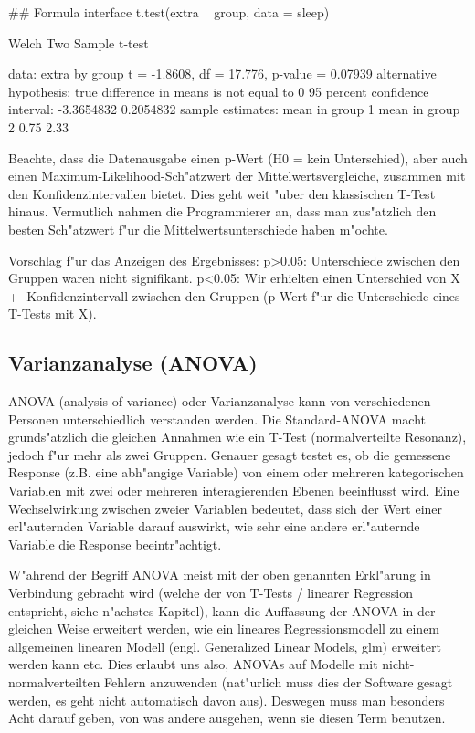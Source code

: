 \documentclass[a4paper,twoside]{tufte-book}\usepackage[]{graphicx}\usepackage[]{color}
\begin{document}
\begin{Schunk}
\begin{Sinput}
## Formula interface
t.test(extra ~ group, data = sleep)
\end{Sinput}
\begin{Soutput}

	Welch Two Sample t-test

data:  extra by group
t = -1.8608, df = 17.776, p-value = 0.07939
alternative hypothesis: true difference in means is not equal to 0
95 percent confidence interval:
 -3.3654832  0.2054832
sample estimates:
mean in group 1 mean in group 2 
           0.75            2.33 
\end{Soutput}
\end{Schunk}

Beachte, dass die Datenausgabe einen p-Wert (H0 = kein Unterschied), aber auch einen Maximum-Likelihood-Sch"atzwert der Mittelwertsvergleiche, zusammen mit den Konfidenzintervallen bietet. Dies geht weit "uber den klassischen T-Test hinaus. Vermutlich nahmen die Programmierer an, dass man zus"atzlich den besten Sch"atzwert f"ur die Mittelwertsunterschiede haben m"ochte.

Vorschlag f"ur das Anzeigen des Ergebnisses: p>0.05: Unterschiede zwischen den Gruppen waren nicht signifikant. p<0.05: Wir erhielten einen Unterschied von X +- Konfidenzintervall zwischen den Gruppen (p-Wert f"ur die Unterschiede eines T-Tests mit X). 

\subsection{Varianzanalyse (ANOVA)}

ANOVA (analysis of variance) oder Varianzanalyse kann von verschiedenen Personen unterschiedlich verstanden werden. Die Standard-ANOVA macht grunds"atzlich die gleichen Annahmen wie ein T-Test (normalverteilte Resonanz), jedoch f"ur mehr als zwei Gruppen. Genauer gesagt testet es, ob die gemessene Response (z.B. eine abh"angige Variable) von einem oder mehreren kategorischen Variablen mit zwei oder mehreren interagierenden Ebenen beeinflusst wird. Eine Wechselwirkung zwischen zweier Variablen bedeutet, dass sich der Wert einer erl"auternden Variable darauf auswirkt, wie sehr eine andere erl"auternde Variable die Response beeintr"achtigt.

W"ahrend der Begriff ANOVA meist mit der oben genannten Erkl"arung in Verbindung gebracht wird (welche der von T-Tests / linearer Regression entspricht, siehe n"achstes Kapitel), kann die Auffassung der ANOVA in der gleichen Weise erweitert werden, wie ein lineares Regressionsmodell zu einem allgemeinen linearen Modell (engl. Generalized Linear Models, glm) erweitert werden kann etc. Dies erlaubt uns also, ANOVAs auf Modelle mit nicht-normalverteilten Fehlern anzuwenden (nat"urlich muss dies der Software gesagt werden, es geht nicht automatisch davon aus). Deswegen muss man besonders Acht darauf geben, von was andere ausgehen, wenn sie diesen Term benutzen.
\end{document}

